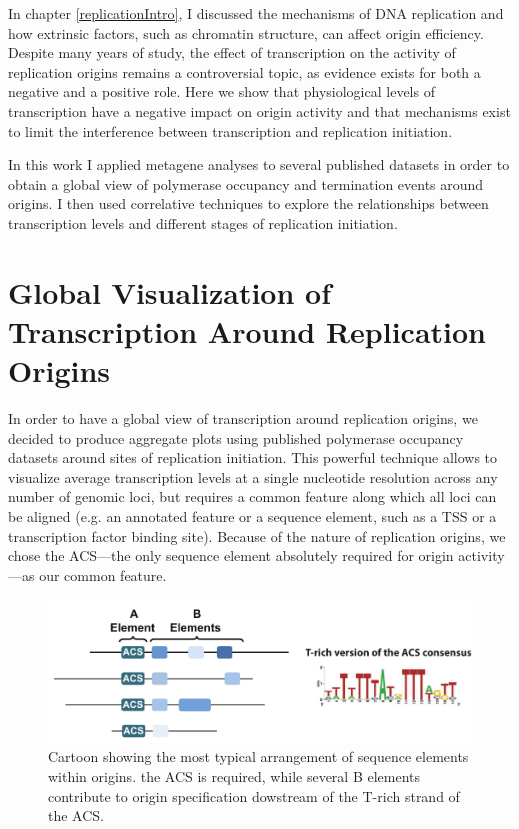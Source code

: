 

In chapter \ref{replicationIntro}, I discussed the mechanisms of DNA replication and how extrinsic factors, such as chromatin structure, can affect origin efficiency. Despite many years of study, the effect of transcription on the activity of replication origins remains a controversial topic, as evidence exists for both a negative and a positive role. 
Here we show that physiological levels of transcription have a negative impact on origin activity and that mechanisms exist to limit the interference between transcription and replication initiation.

In this work I applied metagene analyses to several published datasets in order to obtain a global view of polymerase occupancy and termination events around origins. I then used correlative techniques to explore the relationships between transcription levels and different stages of replication initiation. 

\singlespacing
\section{Global Visualization of Transcription Around Replication Origins}
\doublespacing

In order to have a global view of transcription around replication origins, we decided to produce aggregate plots using published polymerase occupancy datasets \cite{schaughency:2014:genomewide} around sites of replication initiation. This powerful technique allows to visualize average transcription levels at a single nucleotide resolution across any number of genomic loci, but requires a common feature along which all loci can be aligned (e.g. an annotated feature or a sequence element, such as a TSS or a transcription factor binding site). Because of the nature of replication origins, we chose the ACS—the only sequence element absolutely required for origin activity—as our common feature. 

\begin{figure}[ht]

\centering
\includegraphics[width=\textwidth]{figures/results/acs}
\caption[ACS consensus and arrangement relative to other origin DNA elements]{Cartoon showing the most typical arrangement of sequence elements within origins. the ACS is required, while several B elements contribute to origin specification dowstream of the T-rich strand of the ACS.}
\label{fig:originSchema}

\end{figure}

